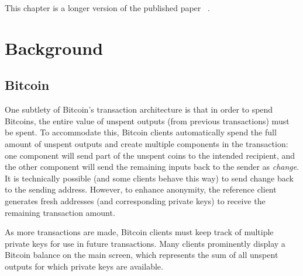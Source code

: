

This chapter is a longer version of the published paper ~\cite{eskandari2015first}.

\section{Background}
\subsection{Bitcoin}
One subtlety of Bitcoin's transaction architecture is that in order to spend Bitcoins, the entire value of unspent outputs (\ie from previous transactions) must be spent. To accommodate this, Bitcoin clients automatically spend the full amount of unspent outputs and create multiple components in the transaction: one component will send part of the unspent coins to the intended recipient, and the other component will send the remaining inputs back to the sender as \emph{change}. It is technically possible (and some clients behave this way) to send change back to the sending address. However, to enhance anonymity, the reference client generates fresh addresses (and corresponding private keys) to receive the remaining transaction amount. 

As more transactions are made, Bitcoin clients must keep track of multiple private keys for use in future transactions. Many clients prominently display a Bitcoin balance on the main screen, which represents the sum of all unspent outputs for which private keys are available. 

